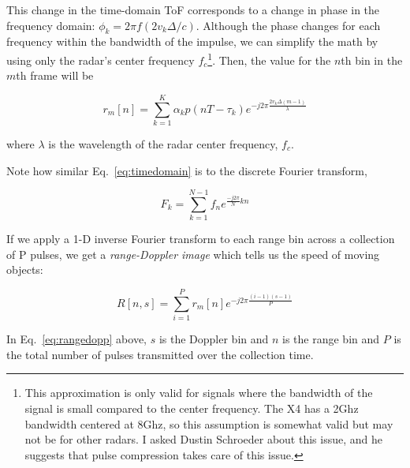\documentclass[12pt]{article}
\begin{document}
This change in the time-domain ToF corresponds to a change in phase in
the frequency domain: $\phi_k = 2\pi f (2v_k\Delta/c)$. Although the
phase changes for each frequency within the bandwidth of the impulse,
we can simplify the math by using only the radar's center frequency
$f_c$\footnote{This approximation is only valid for signals where the
  bandwidth of the signal is small compared to the center
  frequency. The X4 has a 2Ghz bandwidth centered at 8Ghz, so this
  assumption is somewhat valid but may not be for other radars. I
  asked Dustin Schroeder about this issue, and he suggests that pulse
  compression takes care of this issue.}. Then, the value for the
$n$th bin in the $m$th frame will be


\begin{equation}
r_m[n] =  \sum\limits_{k=1}^K \alpha_k p(nT - \tau_k)e^{-j2\pi  \frac{2 v_k \Delta(m-1)}{\lambda}}  
\label{eq:timedomain}
\end{equation}

where $\lambda$ is the wavelength of the radar center frequency,
$f_c$.

Note how similar Eq.~\ref{eq:timedomain} is to the discrete Fourier transform,

\begin{equation}
F_k = \sum\limits_{k=1}^{N-1} f_n e^{\frac{-j2\pi}{N}kn}
\end{equation}

If we apply a 1-D inverse Fourier transform to each range bin across a
collection of P pulses, we get a \emph{range-Doppler image} which
tells us the speed of moving objects:

\begin{equation}
R[n,s] = \sum\limits_{i=1}^{P} r_m[n] e^{-j2\pi\frac{(i-1)(s-1)}{P}}
\label{eq:rangedopp}
\end{equation}

In Eq.~\ref{eq:rangedopp} above, $s$ is the Doppler bin and $n$ is
the range bin and $P$ is the total number of pulses transmitted over
the collection time. 
\end{document}
